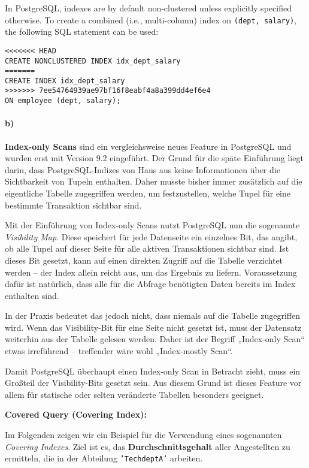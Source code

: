 \documentclass[11pt]{scrartcl}
\begin{document}
In PostgreSQL, indexes are by default non-clustered unless explicitly specified otherwise. To create a combined (i.e., multi-column) index on \texttt{(dept, salary)}, the following SQL statement can be used:

\begin{lstlisting}[style=dbtsql]
<<<<<<< HEAD
CREATE NONCLUSTERED INDEX idx_dept_salary
=======
CREATE INDEX idx_dept_salary
>>>>>>> 7ee54764939ae97bf16f8eabf4a8a399dd4ef6e4
ON employee (dept, salary);
\end{lstlisting}


\paragraph{b)}

\textbf{Index-only Scans} sind ein vergleichsweise neues Feature in PostgreSQL und wurden erst mit Version 9.2 eingeführt. Der Grund für die späte Einführung liegt darin, dass PostgreSQL-Indizes von Haus aus keine Informationen über die Sichtbarkeit von Tupeln enthalten. Daher musste bisher immer zusätzlich auf die eigentliche Tabelle zugegriffen werden, um festzustellen, welche Tupel für eine bestimmte Transaktion sichtbar sind.

Mit der Einführung von Index-only Scans nutzt PostgreSQL nun die sogenannte \textit{Visibility Map}. Diese speichert für jede Datenseite ein einzelnes Bit, das angibt, ob alle Tupel auf dieser Seite für alle aktiven Transaktionen sichtbar sind. Ist dieses Bit gesetzt, kann auf einen direkten Zugriff auf die Tabelle verzichtet werden – der Index allein reicht aus, um das Ergebnis zu liefern. Voraussetzung dafür ist natürlich, dass alle für die Abfrage benötigten Daten bereits im Index enthalten sind.

In der Praxis bedeutet das jedoch nicht, dass niemals auf die Tabelle zugegriffen wird. Wenn das Visibility-Bit für eine Seite nicht gesetzt ist, muss der Datensatz weiterhin aus der Tabelle gelesen werden. Daher ist der Begriff „Index-only Scan“ etwas irreführend – treffender wäre wohl „Index-mostly Scan“.

Damit PostgreSQL überhaupt einen Index-only Scan in Betracht zieht, muss ein Großteil der Visibility-Bits gesetzt sein. Aus diesem Grund ist dieses Feature vor allem für statische oder selten veränderte Tabellen besonders geeignet.

\vspace{0.5em}
\noindent\textbf{Covered Query (Covering Index):}

Im Folgenden zeigen wir ein Beispiel für die Verwendung eines sogenannten \textit{Covering Indexes}. Ziel ist es, das \textbf{Durchschnittsgehalt} aller Angestellten zu ermitteln, die in der Abteilung \texttt{'TechdeptA'} arbeiten.
\end{document}
